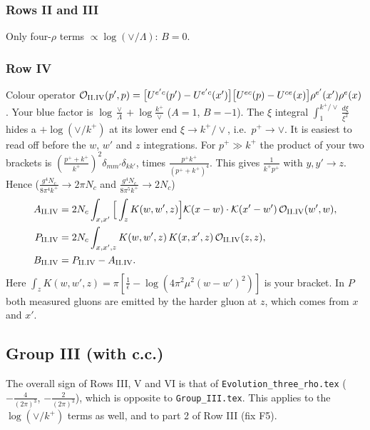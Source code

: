 \documentclass[10pt]{article}
\numberwithin{equation}{section}
\newcommand{\KK}{\mathcal K}
\newcommand{\kp}{k^+}
\newcommand{\pp}{p^+}
\begin{document}
\subsubsection{Rows II and III}
Only four-$\rho$ terms $\propto\log(\vee/\Lambda)$: \textbf{$B=0$}.

\subsubsection{Row IV}\label{sec:II.IV}
Colour operator $\mathcal O_{\rm II.IV}(p',p)=\big[U^{e'c}(p')-U^{e'c}(x')\big]\big[U^{ec}(p)-U^{ce}(x)\big]\rho^{e'}(x')\rho^e(x)$. Your blue factor is $\log\frac{\vee}{\Lambda}+\log\frac{k^+}{\vee}$ ($A=1$, $B=-1$). The $\xi$ integral $\int_1^{k^+/\vee}\frac{d\xi}{\xi^2}$ hides a $+\log(\vee/k^+)$ at its lower end $\xi\to k^+/\vee$, i.e.\ $\pp\to\vee$. It is easiest to read off before the $w$, $w'$ and $z$ integrations. For $\pp\gg\kp$ the product of your two brackets is $(\frac{\pp+\kp}{\kp})^2\delta_{mm'}\delta_{kk'}$, times $\frac{\pp\kp}{(\pp+\kp)^4}$. This gives $\frac{1}{\kp\pp}$ with $y,y'\to z$. Hence ($\frac{g^4N_c}{8\pi^4k^+}\to2\pi N_c$ and $\frac{g^4N_c}{8\pi^5k^+}\to2N_c$)
\begin{align}
A_{\rm II.IV}&=2N_c\int_{x,x'}\Big[\int_zK(w,w',z)\Big]\KK(x-w)\cdot\KK(x'-w')\,\mathcal O_{\rm II.IV}(w',w),\notag\\
P_{\rm II.IV}&=2N_c\int_{x,x',z}K(w,w',z)\,K(x,x',z)\,\mathcal O_{\rm II.IV}(z,z),\notag\\
B_{\rm II.IV}&=P_{\rm II.IV}-A_{\rm II.IV}.
\end{align}
Here $\int_zK(w,w',z)=\pi[\frac1{\bar\epsilon}-\log(4\pi^2\mu^2(w-w')^2)]$ is your bracket. In $P$ both measured gluons are emitted by the harder gluon at $z$, which comes from $x$ and $x'$.

\subsection{Group III (with c.c.)}
The overall sign of Rows III, V and VI is that of \texttt{Evolution\_three\_rho.tex} ($-\frac{4}{(2\pi)^3}$, $-\frac{2}{(2\pi)^3}$), which is opposite to \texttt{Group\_III.tex}. This applies to the $\log(\vee/k^+)$ terms as well, and to part 2 of Row III (fix F5).
\end{document}
